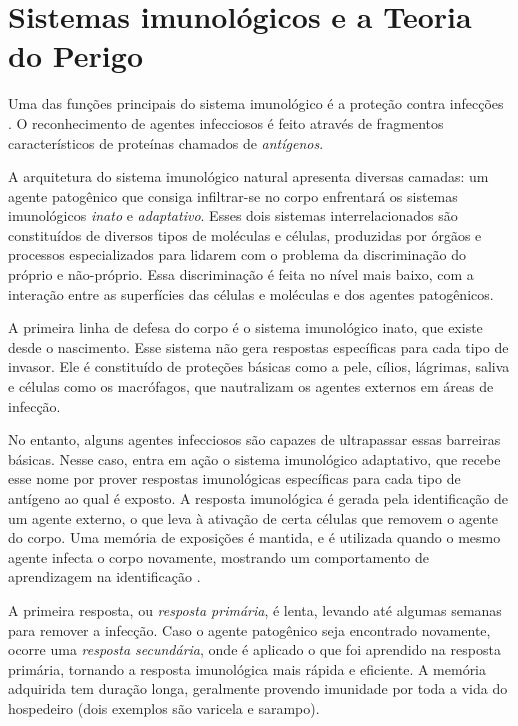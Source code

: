 \chapter{Sistemas imunológicos e a Teoria do Perigo}

Uma das funções principais do sistema imunológico é a proteção contra infecções \cite{Cayzer2007}. O reconhecimento de agentes infecciosos é feito através de fragmentos característicos de proteínas chamados de \emph{antígenos}.

A arquitetura do sistema imunológico natural apresenta diversas camadas: um agente patogênico que consiga infiltrar-se no corpo enfrentará os sistemas imunológicos \emph{inato} e \emph{adaptativo}. Esses dois sistemas interrelacionados são constituídos de diversos tipos de moléculas e células, produzidas por órgãos e processos especializados para lidarem com o problema da discriminação do próprio e não-próprio. Essa discriminação é feita no nível mais baixo, com a interação entre as superfícies das células e moléculas e dos agentes patogênicos.

A primeira linha de defesa do corpo é o sistema imunológico inato, que existe desde o nascimento. Esse sistema não gera respostas específicas para cada tipo de invasor. Ele é constituído de proteções básicas como a pele, cílios, lágrimas, saliva e células como os macrófagos, que nautralizam os agentes externos em áreas de infecção.

No entanto, alguns agentes infecciosos são capazes de ultrapassar essas barreiras básicas. Nesse caso, entra em ação o sistema imunológico adaptativo, que recebe esse nome por prover respostas imunológicas específicas para cada tipo de antígeno ao qual é exposto. A resposta imunológica é gerada pela identificação de um agente externo, o que leva à ativação de certa células que removem o agente do corpo. Uma memória de exposições é mantida, e é utilizada quando o mesmo agente infecta o corpo novamente, mostrando um comportamento de aprendizagem na identificação \cite{Brownlee2011}.

A primeira resposta, ou \emph{resposta primária}, é lenta, levando até algumas semanas para remover a infecção. Caso o agente patogênico seja encontrado novamente, ocorre uma \emph{resposta secundária}, onde é aplicado o que foi aprendido na resposta primária, tornando a resposta imunológica mais rápida e eficiente. A memória adquirida tem duração longa, geralmente provendo imunidade por toda a vida do hospedeiro (dois exemplos são varicela e sarampo).

